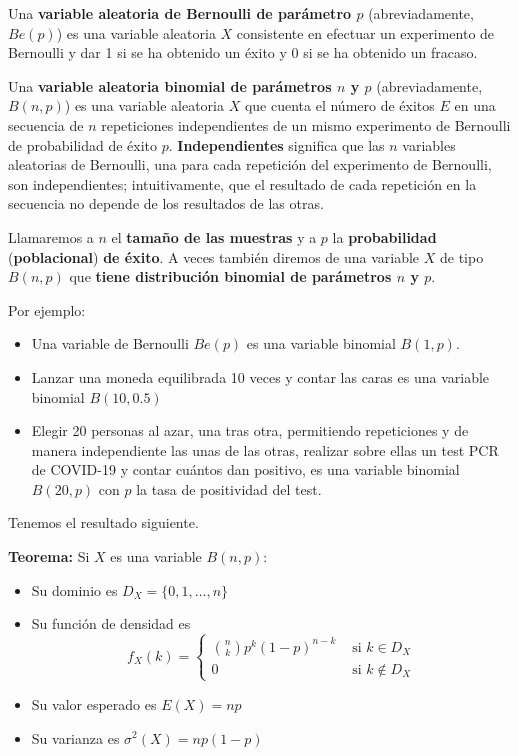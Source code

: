 \documentclass[
  spanish,
  letterpaper,
  DIV=11,
  numbers=noendperiod]{scrreprt}
\begin{document}
Una \textbf{variable aleatoria de Bernoulli de parámetro \(p\)}
(abreviadamente, \(Be(p)\)) es una variable aleatoria \(X\) consistente
en efectuar un experimento de Bernoulli y dar 1 si se ha obtenido un
éxito y 0 si se ha obtenido un fracaso.

Una \textbf{variable aleatoria binomial de parámetros \(n\) y \(p\)}
(abreviadamente, \(B(n,p)\)) es una variable aleatoria \(X\) que cuenta
el número de éxitos \(E\) en una secuencia de \(n\) repeticiones
independientes de un mismo experimento de Bernoulli de probabilidad de
éxito \(p\). \textbf{Independientes} significa que las \(n\) variables
aleatorias de Bernoulli, una para cada repetición del experimento de
Bernoulli, son independientes; intuitivamente, que el resultado de cada
repetición en la secuencia no depende de los resultados de las otras.

Llamaremos a \(n\) el \textbf{tamaño de las muestras} y a \(p\) la
\textbf{probabilidad} (\textbf{poblacional}) \textbf{de éxito}. A veces
también diremos de una variable \(X\) de tipo \(B(n,p)\) que
\textbf{tiene distribución binomial de parámetros \(n\) y \(p\)}.

Por ejemplo:

\begin{itemize}
\item
  Una variable de Bernoulli \(Be(p)\) es una variable binomial
  \(B(1,p)\).
\item
  Lanzar una moneda equilibrada 10 veces y contar las caras es una
  variable binomial \(B(10,0.5)\)
\item
  Elegir 20 personas al azar, una tras otra, permitiendo repeticiones y
  de manera independiente las unas de las otras, realizar sobre ellas un
  test PCR de COVID-19 y contar cuántos dan positivo, es una variable
  binomial \(B(20,p)\) con \(p\) la tasa de positividad del test.
\end{itemize}

Tenemos el resultado siguiente.

\textbf{Teorema:} Si \(X\) es una variable \(B(n,p)\):

\begin{itemize}
\item
  Su dominio es \(D_X=\{0,1,\ldots,n\}\)
\item
  Su función de densidad es \[
  f_X(k)=\left\{\begin{array}{ll}
  \displaystyle\binom{n}{k}p^k(1-p)^{n-k} & \text{ si $k\in D_X$}\\
  0 & \text{ si $k\notin D_X$}
  \end{array}\right.
  \]
\item
  Su valor esperado es \(E(X)=np\)
\item
  Su varianza es \(\sigma^2(X)=np(1-p)\)
\end{itemize}
\end{document}
